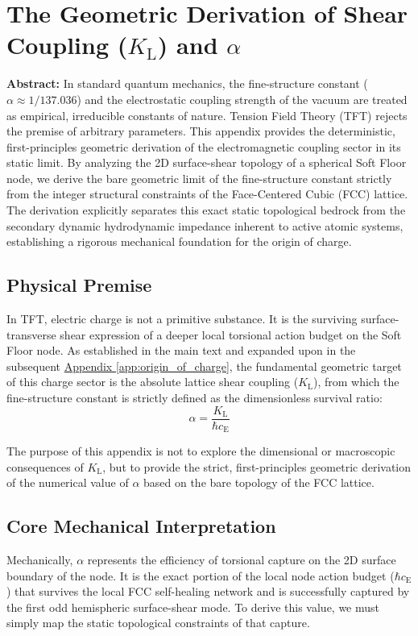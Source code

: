 \chapter{The Geometric Derivation of Shear Coupling ($K_{\mathrm{L}}$) and $\alpha$}
\label{app:geometric_alpha}

\noindent\textbf{Abstract:} In standard quantum mechanics, the fine-structure constant ($\alpha \approx 1/137.036$) and the electrostatic coupling strength of the vacuum are treated as empirical, irreducible constants of nature. Tension Field Theory (TFT) rejects the premise of arbitrary parameters. This appendix provides the deterministic, first-principles geometric derivation of the electromagnetic coupling sector in its static limit. By analyzing the 2D surface-shear topology of a spherical Soft Floor node, we derive the bare geometric limit of the fine-structure constant strictly from the integer structural constraints of the Face-Centered Cubic (FCC) lattice. The derivation explicitly separates this exact static topological bedrock from the secondary dynamic hydrodynamic impedance inherent to active atomic systems, establishing a rigorous mechanical foundation for the origin of charge.

\section{Physical Premise}
In TFT, electric charge is not a primitive substance. It is the surviving surface-transverse shear expression of a deeper local torsional action budget on the Soft Floor node. As established in the main text and expanded upon in the subsequent \hyperref[app:origin_of_charge]{Appendix \ref*{app:origin_of_charge}}, the fundamental geometric target of this charge sector is the absolute lattice shear coupling ($K_{\mathrm{L}}$), from which the fine-structure constant is strictly defined as the dimensionless survival ratio:
\begin{equation}
    \alpha = \frac{K_{\mathrm{L}}}{\hbar c_{\mathrm{E}}}
\end{equation}

The purpose of this appendix is not to explore the dimensional or macroscopic consequences of $K_{\mathrm{L}}$, but to provide the strict, first-principles geometric derivation of the numerical value of $\alpha$ based on the bare topology of the FCC lattice.

\section{Core Mechanical Interpretation}
Mechanically, $\alpha$ represents the efficiency of torsional capture on the 2D surface boundary of the node. It is the exact portion of the local node action budget ($\hbar c_{\mathrm{E}}$) that survives the local FCC self-healing network and is successfully captured by the first odd hemispheric surface-shear mode. To derive this value, we must simply map the static topological constraints of that capture.

